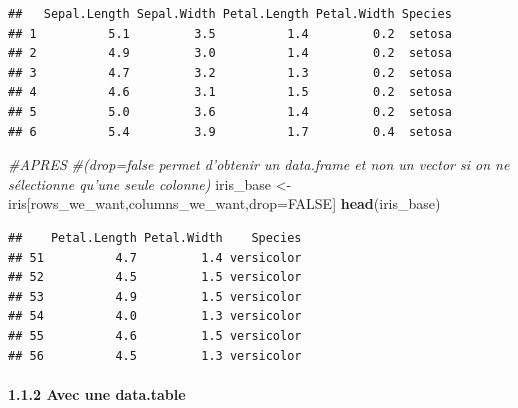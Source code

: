\documentclass[
]{article}
\newenvironment{Shaded}{\begin{snugshade}}{\end{snugshade}}
\newcommand{\CommentTok}[1]{\textcolor[rgb]{0.56,0.35,0.01}{\textit{#1}}}
\newcommand{\DecValTok}[1]{\textcolor[rgb]{0.00,0.00,0.81}{#1}}
\newcommand{\KeywordTok}[1]{\textcolor[rgb]{0.13,0.29,0.53}{\textbf{#1}}}
\newcommand{\NormalTok}[1]{#1}
\newcommand{\OperatorTok}[1]{\textcolor[rgb]{0.81,0.36,0.00}{\textbf{#1}}}
\newcommand{\OtherTok}[1]{\textcolor[rgb]{0.56,0.35,0.01}{#1}}
\newcommand{\StringTok}[1]{\textcolor[rgb]{0.31,0.60,0.02}{#1}}
\begin{document}
\begin{Shaded}
\end{Shaded}

\begin{verbatim}
##   Sepal.Length Sepal.Width Petal.Length Petal.Width Species
## 1          5.1         3.5          1.4         0.2  setosa
## 2          4.9         3.0          1.4         0.2  setosa
## 3          4.7         3.2          1.3         0.2  setosa
## 4          4.6         3.1          1.5         0.2  setosa
## 5          5.0         3.6          1.4         0.2  setosa
## 6          5.4         3.9          1.7         0.4  setosa
\end{verbatim}

\begin{Shaded}
\begin{Highlighting}[]
\CommentTok{#APRES}
\CommentTok{#(drop=false permet d'obtenir un data.frame et non un vector si on ne sélectionne qu'une seule colonne)}
\NormalTok{iris_base <-}\StringTok{ }\NormalTok{iris[rows_we_want,columns_we_want,drop=}\OtherTok{FALSE}\NormalTok{]}
\KeywordTok{head}\NormalTok{(iris_base)}
\end{Highlighting}
\end{Shaded}

\begin{verbatim}
##    Petal.Length Petal.Width    Species
## 51          4.7         1.4 versicolor
## 52          4.5         1.5 versicolor
## 53          4.9         1.5 versicolor
## 54          4.0         1.3 versicolor
## 55          4.6         1.5 versicolor
## 56          4.5         1.3 versicolor
\end{verbatim}

\hypertarget{avec-une-data.table}{%
\paragraph{1.1.2 Avec une data.table}\label{avec-une-data.table}}
\end{document}
